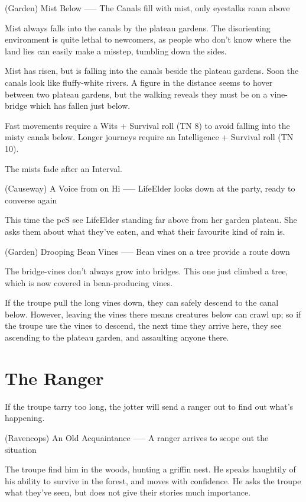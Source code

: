 (Garden) Mist Below
-----
{The Canals fill with mist, only eyestalks roam above}

Mist always falls into the canals by the plateau gardens.
The disorienting environment is quite lethal to newcomers, as people who don't know where the land lies can easily make a misstep, tumbling down the sides.

\begin{boxtext}
  Mist has risen, but is falling into the canals beside the plateau gardens.
  Soon the canals look like fluffy-white rivers.
  A figure in the distance seems to hover between two plateau gardens, but the walking reveals they must be on a vine-bridge which has fallen just below.
\end{boxtext}

Fast movements require a Wits + Survival roll (TN 8) to avoid falling into the misty canals below.
Longer journeys require an Intelligence + Survival roll (TN 10).

The mists fade after an Interval.

(Causeway) A Voice from on Hi
-----
{LifeElder looks down at the party, ready to converse again}

This time the \gls{pc}S see LifeElder standing far above from her garden plateau.
She asks them about what they've eaten, and what their favourite kind of rain is.

(Garden) Drooping Bean Vines
-----
{Bean vines on a tree provide a route down}

The bridge-vines don't always grow into bridges.
This one just climbed a tree, which is now covered in bean-producing vines.

If the troupe pull the long vines down, they can safely descend to the canal below.
However, leaving the vines there means creatures below can crawl up; so if the troupe use the vines to descend, the next time they arrive here, they see  ascending to the plateau garden, and assaulting anyone there.

\section{The Ranger}

If the troupe tarry too long, the \gls{jotter} will send a ranger out to find out what's happening.

(Ravencops) An Old Acquaintance
-----
{A ranger arrives to scope out the situation}

The troupe find him in the woods, hunting a griffin nest.
He speaks haughtily of his ability to survive in the forest, and moves with confidence.
He asks the troupe what they've seen, but does not give their stories much importance.


